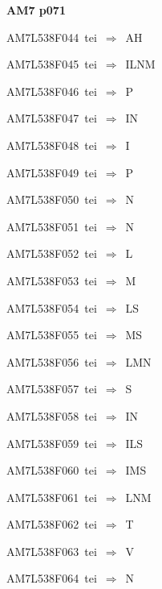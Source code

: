 \par\vfill\eject
{\bf\hfill AM7 p071\hfill\hbox{}}\par\bigskip
{\sixrm AM7L538F044\ {\sixit tei}\ }$\Rightarrow$\ AH\par\smallskip
{\sixrm AM7L538F045\ {\sixit tei}\ }$\Rightarrow$\ ILNM\par\smallskip
{\sixrm AM7L538F046\ {\sixit tei}\ }$\Rightarrow$\ P\par\smallskip
{\sixrm AM7L538F047\ {\sixit tei}\ }$\Rightarrow$\ IN\par\smallskip
{\sixrm AM7L538F048\ {\sixit tei}\ }$\Rightarrow$\ I\par\smallskip
{\sixrm AM7L538F049\ {\sixit tei}\ }$\Rightarrow$\ P\par\smallskip
{\sixrm AM7L538F050\ {\sixit tei}\ }$\Rightarrow$\ N\par\smallskip
{\sixrm AM7L538F051\ {\sixit tei}\ }$\Rightarrow$\ N\par\smallskip
{\sixrm AM7L538F052\ {\sixit tei}\ }$\Rightarrow$\ L\par\smallskip
{\sixrm AM7L538F053\ {\sixit tei}\ }$\Rightarrow$\ M\par\smallskip
{\sixrm AM7L538F054\ {\sixit tei}\ }$\Rightarrow$\ LS\par\smallskip
{\sixrm AM7L538F055\ {\sixit tei}\ }$\Rightarrow$\ MS\par\smallskip
{\sixrm AM7L538F056\ {\sixit tei}\ }$\Rightarrow$\ LMN\par\smallskip
{\sixrm AM7L538F057\ {\sixit tei}\ }$\Rightarrow$\ S\par\smallskip
{\sixrm AM7L538F058\ {\sixit tei}\ }$\Rightarrow$\ IN\par\smallskip
{\sixrm AM7L538F059\ {\sixit tei}\ }$\Rightarrow$\ ILS\par\smallskip
{\sixrm AM7L538F060\ {\sixit tei}\ }$\Rightarrow$\ IMS\par\smallskip
{\sixrm AM7L538F061\ {\sixit tei}\ }$\Rightarrow$\ LNM\par\smallskip
{\sixrm AM7L538F062\ {\sixit tei}\ }$\Rightarrow$\ T\par\smallskip
{\sixrm AM7L538F063\ {\sixit tei}\ }$\Rightarrow$\ V\par\smallskip
{\sixrm AM7L538F064\ {\sixit tei}\ }$\Rightarrow$\ N\par\smallskip

